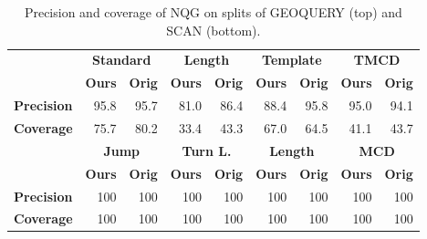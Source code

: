 \begin{table}[]
\centering
\scriptsize
\begin{tabular}{lrrrrrrrr}
\toprule
 &
  \multicolumn{2}{c}{\textbf{Standard}} &
  \multicolumn{2}{c}{\textbf{Length}} &
  \multicolumn{2}{c}{\textbf{Template}} &
  \multicolumn{2}{c}{\textbf{TMCD}} \\
 &
  \multicolumn{1}{l}{\textbf{Ours}} &
  \multicolumn{1}{l}{\textbf{Orig}} &
  \multicolumn{1}{l}{\textbf{Ours}} &
  \multicolumn{1}{l}{\textbf{Orig}} &
  \multicolumn{1}{l}{\textbf{Ours}} &
  \multicolumn{1}{l}{\textbf{Orig}} &
  \multicolumn{1}{l}{\textbf{Ours}} &
  \multicolumn{1}{l}{\textbf{Orig}} \\
  \midrule
\textbf{Precision} &
  95.8 &
  95.7 &
  81.0 &
  86.4 &
  88.4 &
  95.8 &
  95.0 &
  94.1 \\
\textbf{Coverage} &
  75.7 &
  80.2 &
  33.4 &
  43.3 &
  67.0 &
  64.5 &
  41.1 &
  43.7 \\
  \toprule
 &
  \multicolumn{2}{c}{\textbf{Jump}} &
  \multicolumn{2}{c}{\textbf{Turn L.}} &
  \multicolumn{2}{c}{\textbf{Length}} &
  \multicolumn{2}{c}{\textbf{MCD}} \\
 &
  \multicolumn{1}{l}{\textbf{Ours}} &
  \multicolumn{1}{l}{\textbf{Orig}} &
  \multicolumn{1}{l}{\textbf{Ours}} &
  \multicolumn{1}{l}{\textbf{Orig}} &
  \multicolumn{1}{l}{\textbf{Ours}} &
  \multicolumn{1}{l}{\textbf{Orig}} &
  \multicolumn{1}{l}{\textbf{Ours}} &
  \multicolumn{1}{l}{\textbf{Orig}} \\
  \midrule
\textbf{Precision} &
  100 &
  100 &
  100 &
  100 &
  100 &
  100 &
  100 &
  100 \\
\textbf{Coverage} &
  100 &
  100 &
  100 &
  100 &
  100 &
  100 &
  100 &
  100 \\
  \bottomrule
\end{tabular}
\caption{\footnotesize Precision and coverage of NQG on splits of GEOQUERY (top) and SCAN (bottom).}
\label{tab:nqg-precision}
\end{table}